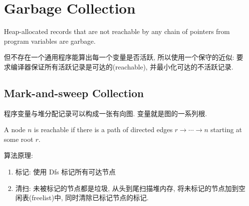 \newpage
\section{Garbage Collection}

\begin{definition}[Garbage]
    Heap-allocated records that are not reachable by any chain of pointers from program variables are garbage.
\end{definition}


但不存在一个通用程序能算出每一个变量是否活跃, 所以使用一个保守的近似: 要求编译器保证所有活跃记录是可达的(reachable), 并最小化可达的不活跃记录. 

\subsection{Mark-and-sweep Collection}
程序变量与堆分配记录可以构成一张有向图. 变量就是图的一系列根.

\begin{definition}[reachable]
    A node $n$ is reachable if there is a path of directed edges $r \to\cdots \to  n$ starting at some root $r$.
\end{definition}

算法原理:
\begin{enumerate}
    \item 标记: 使用 Dfs 标记所有可达节点
    \item 清扫: 未被标记的节点都是垃圾, 从头到尾扫描堆内存, 将未标记的节点加到空闲表(freelist)中, 同时清除已标记节点的标记. 
\end{enumerate}


